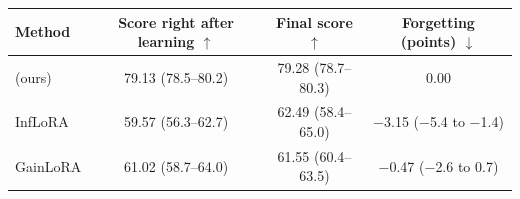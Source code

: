 \begin{tabular}{lccc}
    \toprule
    Method & \shortstack[c]{Score\\right after\\learning $\uparrow$} & \shortstack[c]{Final\\score $\uparrow$} & \shortstack[c]{Forgetting\\(points) $\downarrow$} \\
    \midrule
    \cert{} (ours) & 79.13 {\scriptsize(78.5--80.2)} & 79.28 {\scriptsize(78.7--80.3)} & 0.00 \\
    InfLoRA & 59.57 {\scriptsize(56.3--62.7)} & 62.49 {\scriptsize(58.4--65.0)} & $-$3.15 {\scriptsize($-$5.4 to $-$1.4)} \\
    GainLoRA & 61.02 {\scriptsize(58.7--64.0)} & 61.55 {\scriptsize(60.4--63.5)} & $-$0.47 {\scriptsize($-$2.6 to 0.7)} \\
    \bottomrule
\end{tabular}
